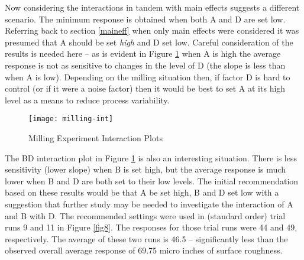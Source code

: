 Now considering the interactions in tandem with main effects suggests a different scenario.  The minimum response is obtained when both A and D are set low. Referring back to section \ref{maineff} when only main effects were considered it was presumed that A should be set \textit{high} and D set low.  Careful consideration of the results is needed here -- as is evident in Figure \ref{fig9} when A is high the average response is not as sensitive to changes in the level of D (the slope is less than when A is low).  Depending on the milling situation then, if factor D is hard to control (or if it were a noise factor) then it would be best to set A at its high level as a means to reduce process variability.

\begin{figure}[h]\caption{Milling Experiment Interaction Plots}\label{fig9}
\begin{center}
\texttt{[image: milling-int]}
\end{center}
\end{figure}

The BD interaction plot in Figure \ref{fig9} is also an interesting situation. There is less sensitivity (lower slope) when B is set high, but the average response is much lower when B and D are both set to their low levels. The initial recommendation based on these results would be that A be set high, B and D set low with a suggestion that further study may be needed to investigate the interaction of A and B with D. The recommended settings were used in (standard order) trial runs 9 and 11 in Figure \ref{fig8}. The responses for those trial runs were 44 and 49, respectively.  The average of these two runs is 46.5 -- significantly less than the observed overall average response of 69.75 micro inches of surface roughness.